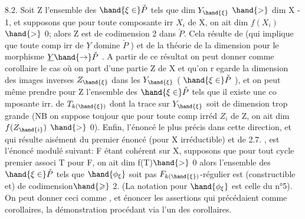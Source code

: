 
8.2. Soit Z l'ensemble des $\hand{\xi\in}\check{P}$ tels que dim $Y_{\hand{\xi}}$ $\hand{>}$ dim X - 1,\hand{\unsure{\xi}}
et supposons que pour toute composante irr $X_i$ de X, on ait dim $f(X_i)$ $\hand{>}$ 0;
alors Z est de codimension 2 dans $\check{P}$.  Cela
résulte de 
 (qui implique que toute comp irr de $\underline{Y}$ domine $\check{P}$ ) et de
la théorie de la dimension pour le morphisme $\underline{Y} \hand{\to} \check{P}$ . A partir de ce
résultat  on peut donner comme corollaire le cas où on
part d'une partie   Z de X et qu'on r egarde la dimension des
images inverses $Z_{\hand{\xi}}$ dans les $Y_{\hand{\xi}}$ ( $\hand{\xi\in}\check{P}$ ), et on peut même prendre pour
Z l'ensemble des $\hand{\xi\in}\check{P}$ tels que il existe une co mposante irr. de $T_{k(\hand{\xi})}$
dont la trace sur $Y_{\hand{\xi}}$ soit de dimension trop grande (NB on suppose toujour
que pour toute comp irréd $Z_i$ de Z, on ait dim $f(Z_{\hand{i}})$ $\hand{>}$ 0). Enfin, l'énoncé
le plus précis dans cette direction, et qui résulte aisément du premier
énoncé (pour X irréductible) et de 2.7. , est l'énoncé modulé suivant:
F étant cohérent sur X,  supposons que pour tout cycle premier associ
T pour F, on ait dim f(T)$\hand{>}$ 0\unsure{;} alors l'ensemble des $\hand{\xi\in}\check{P}$ tels que
$\hand{\phi_\xi}$  soit pas $F_{k(\hand{\xi})}$-régulier est (constructible et) de codimension$\hand{\geqslant}$ 2.
\margin{\textbar} (La notation pour $\hand{\phi_\xi}$ est celle du n°5). On peut donner ceci comme
\margin{\textbar} , et énoncer les  assertions qui précédaient
\margin{\textbar} comme corollaires, la démonstration procédant via l'un des corollaires.


